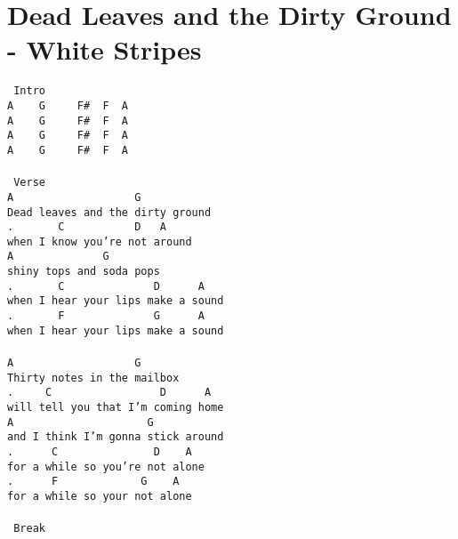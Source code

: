 \newpage
\section{Dead Leaves and the Dirty Ground - White Stripes}
\label{Dead Leaves and the Dirty Ground - White Stripes}
\texttt{\lbrack\ Intro\rbrack\\
A\ \ \ \ G\ \ \ \ \ F\#\ \ F\ \ A\\
A\ \ \ \ G\ \ \ \ \ F\#\ \ F\ \ A\\
A\ \ \ \ G\ \ \ \ \ F\#\ \ F\ \ A\\
A\ \ \ \ G\ \ \ \ \ F\#\ \ F\ \ A\\
\\
\lbrack\ Verse\rbrack\\
A\ \ \ \ \ \ \ \ \ \ \ \ \ \ \ \ \ \ \ G\\
Dead\ leaves\ and\ the\ dirty\ ground\\
.\ \ \ \ \ \ \ C\ \ \ \ \ \ \ \ \ \ \ D\ \ \ A\\
when\ I\ know\ you're\ not\ around\\
A\ \ \ \ \ \ \ \ \ \ \ \ \ \ G\\
shiny\ tops\ and\ soda\ pops\\
.\ \ \ \ \ \ \ C\ \ \ \ \ \ \ \ \ \ \ \ \ \ D\ \ \ \ \ \ A\\
when\ I\ hear\ your\ lips\ make\ a\ sound\\
.\ \ \ \ \ \ \ F\ \ \ \ \ \ \ \ \ \ \ \ \ \ G\ \ \ \ \ \ A\\
when\ I\ hear\ your\ lips\ make\ a\ sound\\
\\
A\ \ \ \ \ \ \ \ \ \ \ \ \ \ \ \ \ \ \ G\\
Thirty\ notes\ in\ the\ mailbox\\
.\ \ \ \ \ C\ \ \ \ \ \ \ \ \ \ \ \ \ \ \ \ \ D\ \ \ \ \ \ A\\
will\ tell\ you\ that\ I'm\ coming\ home\\
A\ \ \ \ \ \ \ \ \ \ \ \ \ \ \ \ \ \ \ \ \ G\\
and\ I\ think\ I'm\ gonna\ stick\ around\\
.\ \ \ \ \ \ C\ \ \ \ \ \ \ \ \ \ \ \ \ \ \ D\ \ \ \ A\\
for\ a\ while\ so\ you're\ not\ alone\\
.\ \ \ \ \ \ F\ \ \ \ \ \ \ \ \ \ \ \ \ G\ \ \ \ A\\
for\ a\ while\ so\ your\ not\ alone\\
\\
\lbrack\ Break\rbrack\\
}
